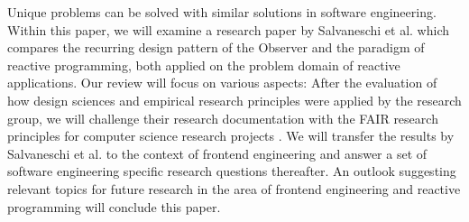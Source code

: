 Unique problems can be solved with similar solutions in software engineering. Within this paper, we will examine a research paper by Salvaneschi et al. \cite{7827078} which compares the recurring design pattern of the Observer \cite{gamma1995design} and the paradigm of reactive programming, both applied on the problem domain of reactive applications. Our review will focus on various aspects: After the evaluation of how design sciences \cite{wieringa} and empirical research principles were applied by the research group, we will challenge their research documentation with the FAIR research principles \cite{wilkinson:2016} for computer science research projects \cite{2019arXiv190805986H}. We will transfer the results by Salvaneschi et al. to the context of frontend engineering and answer a set of software engineering specific research questions thereafter. An outlook suggesting relevant topics for future research in the area of frontend engineering and reactive programming will conclude this paper.